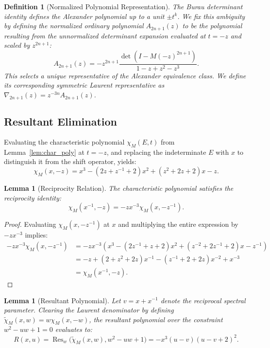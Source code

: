 \documentclass[11pt]{article}
\newtheorem{lemma}[theorem]{Lemma}
\newtheorem{definition}[theorem]{Definition}
\begin{document}
\begin{definition}[Normalized Polynomial Representation]\label{def:recip_poly}
The Burau determinant identity defines the Alexander polynomial up to a unit $\pm t^k$. We fix this ambiguity by defining the normalized ordinary polynomial $A_{2n+1}(z)$ to be the polynomial resulting from the unnormalized determinant expansion evaluated at $t=-z$ and scaled by $z^{2n+1}$:
\begin{equation}
A_{2n+1}(z) = -z^{2n+1} \frac{\det(I - M(-z)^{2n+1})}{1-z+z^2-z^3}.
\end{equation}
This selects a unique representative of the Alexander equivalence class. We define its corresponding symmetric Laurent representative as $\nabla_{2n+1}(z) = z^{-3n} A_{2n+1}(z)$.
\end{definition}

\subsection{Resultant Elimination}

Evaluating the characteristic polynomial $\chi_M(E,t)$ from Lemma~\ref{lem:char_poly} at $t=-z$, and replacing the indeterminate $E$ with $x$ to distinguish it from the shift operator, yields:
\begin{equation}
\chi_M(x, -z) = x^3 - (2z + z^{-1} + 2)x^2 + (z^2 + 2z + 2)x - z.
\end{equation}

\begin{lemma}[Reciprocity Relation]\label{lem:reciprocity}
The characteristic polynomial satisfies the reciprocity identity:
\[
\chi_M(x^{-1},-z) = -zx^{-3}\chi_M(x,-z^{-1}).
\]
\end{lemma}
\begin{proof}
Evaluating $\chi_M(x, -z^{-1})$ at $x$ and multiplying the entire expression by $-zx^{-3}$ implies:
\begin{align*}
-zx^{-3} \chi_M(x, -z^{-1}) &= -zx^{-3} \left( x^3 - (2z^{-1}+z+2)x^2 + (z^{-2}+2z^{-1}+2)x - z^{-1} \right) \\
&= -z + (2+z^2+2z)x^{-1} - (z^{-1}+2+2z)x^{-2} + x^{-3} \\
&= \chi_M(x^{-1}, -z).
\end{align*}
\end{proof}

\begin{lemma}[Resultant Polynomial]\label{lem:resultant}
Let $v = x + x^{-1}$ denote the reciprocal spectral parameter. Clearing the Laurent denominator by defining $\widetilde{\chi}_M(x, w) = w \chi_M(x, -w)$, the resultant polynomial over the constraint $w^2-uw+1=0$ evaluates to:
\begin{equation}
R(x, u) = \operatorname{Res}_w\big(\widetilde{\chi}_M(x, w), w^2-uw+1\big) = -x^3 (u-v)(u-v+2)^2.
\end{equation}
\end{lemma}
\end{document}

